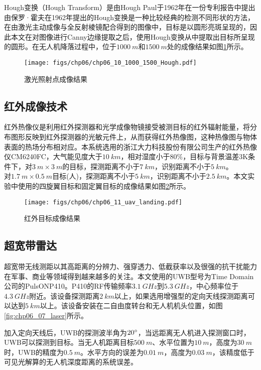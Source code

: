Hough变换（Hough Transform）是由Hough Paul于1962年在一份专利报告中提出\cite{vc1962method}
由保罗·霍夫在1962年提出的Hough变换是一种比较经典的检测不同形状的方法，在由激光主动成像与全反射棱镜配合得到的图像中，目标是以圆形亮斑呈现的，因此本文在对图像进行Canny边缘提取之后，使用Hough变换从中提取出目标所呈现的圆形。在无人机降落过程中，位于$1000\ m$和$1500\ m$处的成像结果如图\ref{fig:chp06_10_1000_1500_Hough}所示。

\begin{figure}[!t]
	\centering
	\texttt{[image: figs/chp06/chp06\_10\_1000\_1500\_Hough.pdf]}	
	\caption{激光照射点成像结果}
	\label{fig:chp06_10_1000_1500_Hough}
\end{figure}


\subsection{红外成像技术}
红外热像仪是利用红外探测器和光学成像物镜接受被测目标的红外辐射能量，将分布图形反映到红外探测器的光敏元件上，从而获得红外热像图，这种热像图与物体表面的热场分布相对应。本系统选用的浙江大力科技股份有限公司生产的红外热像仪CM6240FC，大气能见度大于$10\ km$，相对湿度小于$80\%$，目标与背景温差3K条件下，对$3\ m\times3\ m$的目标，探测距离不小于$7\ km$，识别距离不小于$5\ km$。$对1.7\ m\times0.5\ m$目标(人)，探测距离不小于$5\ km$，识别距离不小于$2.5\ km$。本文实验中使用的四旋翼目标和固定翼目标的成像结果如图\ref{fig:chp06_11_uav_landing}所示。

\begin{figure}[!t]
	\centering
	\texttt{[image: figs/chp06/chp06\_11\_uav\_landing.pdf]}	
	\caption{红外目标成像结果}
	\label{fig:chp06_11_uav_landing}
\end{figure}

\subsection{超宽带雷达}
超宽带无线测距以其高距离的分辨力、强穿透力、低截获率以及很强的抗干扰能力在军事、商业等领域得到越来越多的关注。本文使用的UWB型号为Time Domain公司的PulsONP410。P410的RF传输频率$3.1\ GHz$到$5.3\ GHz$，中心频率位于$4.3\ GHz$附近。该设备探测距离$2\ km$以上，如果选用增强型的定向天线探测距离可以达到$5\ km$以上。该设备安装在二自由度转台和无人机机头位置，如图\ref{fig:chp06_07_laser}所示。

加入定向天线后，UWB的探测波半角为$20\degree$，当远距离无人机进入探测窗口时，UWB可以探测到目标。当无人机距离目标$500\ m$、水平位置为$10\ m$，高度为$30\ m$时，UWB的精度为$0.5\ m$。水平方向的误差为$0.01\ m$，高度为$0.03\ m$，该精度低于可见光解算的无人机深度距离的系统误差。

